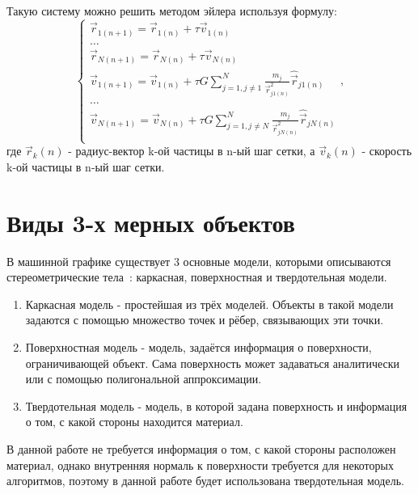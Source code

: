 Такую систему можно решить методом эйлера используя формулу:
\begin{equation}
	\label{n_euler_velocities}
	\begin{cases}
		\vec{r}_{1(n+1)} = \vec{r}_{1(n)} + \tau \vec{v}_{1(n)} \\
		\dots \\
		\vec{r}_{N(n+1)} = \vec{r}_{N(n)} + \tau \vec{v}_{N(n)} \\
		
		
		\vec{v}_{1(n+1)} = \vec{v}_{1(n)} + \tau G\sum_{j=1, j \neq 1}^{N}{\frac{m_j}{\vec{r}_{j1(n)}^2}\hat{\vec{r}}_{j1(n)}} \\
		\dots \\
		\vec{v}_{N(n+1)} = \vec{v}_{N(n)} + \tau G\sum_{j=1, j \neq N}^{N}{\frac{m_j}{\vec{r}_{jN(n)}^2}\hat{\vec{r}}_{jN(n)}} \\
	\end{cases},
\end{equation}
где $\vec{r}_k(n)$ - радиус-вектор k-ой частицы в n-ый шаг сетки, а $\vec{v}_k(n)$ - скорость k-ой частицы в n-ый шаг сетки.

\section{Виды 3-х мерных объектов}
В машинной графике существует 3 основные модели, которыми описываются стереометрические тела~\cite{rodgers}: каркасная, поверхностная и твердотельная модели.

\begin{enumerate}
	\item Каркасная модель - простейшая из трёх моделей. Объекты в такой модели задаются с помощью множество точек и рёбер, связывающих эти точки.
	\item Поверхностная модель - модель, задаётся информация о поверхности, ограничивающей объект. Сама поверхность может задаваться аналитически или с помощью полигональной аппроксимации.
	\item Твердотельная модель - модель, в которой задана поверхность и информация о том, с какой стороны находится материал.
\end{enumerate}

В данной работе не требуется информация о том, с какой стороны расположен материал, однако внутренняя нормаль к поверхности требуется для некоторых алгоритмов, поэтому в данной работе будет использована твердотельная модель.

